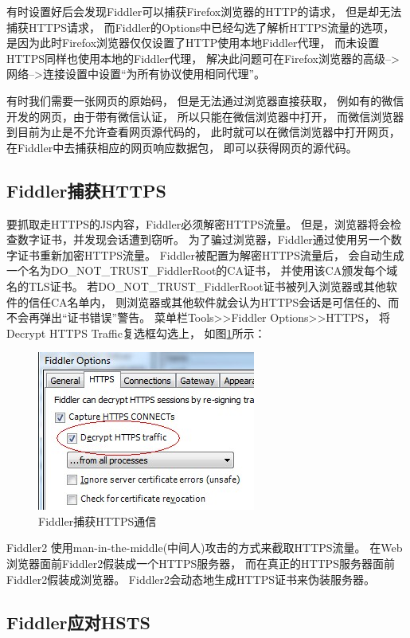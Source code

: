 \documentclass{book}
\begin{document}
有时设置好后会发现Fiddler可以捕获Firefox浏览器的HTTP的请求，
但是却无法捕获HTTPS请求，
而Fiddler的Options中已经勾选了解析HTTPS流量的选项，
是因为此时Firefox浏览器仅仅设置了HTTP使用本地Fiddler代理，
而未设置HTTPS同样也使用本地的Fiddler代理，
解决此问题可在Firefox浏览器的高级-->网络-->连接设置中设置“为所有协议使用相同代理”。

有时我们需要一张网页的原始码，
但是无法通过浏览器直接获取，
例如有的微信开发的网页，由于带有微信认证，
所以只能在微信浏览器中打开，
而微信浏览器到目前为止是不允许查看网页源代码的，
此时就可以在微信浏览器中打开网页，
在Fiddler中去捕获相应的网页响应数据包，
即可以获得网页的源代码。

\subsection{Fiddler捕获HTTPS}

要抓取走HTTPS的JS内容，Fiddler必须解密HTTPS流量。
但是，浏览器将会检查数字证书，并发现会话遭到窃听。
为了骗过浏览器，Fiddler通过使用另一个数字证书重新加密HTTPS流量。
Fiddler被配置为解密HTTPS流量后，
会自动生成一个名为DO\_NOT\_TRUST\_FiddlerRoot的CA证书，
并使用该CA颁发每个域名的TLS证书。
若DO\_NOT\_TRUST\_FiddlerRoot证书被列入浏览器或其他软件的信任CA名单内，
则浏览器或其他软件就会认为HTTPS会话是可信任的、而不会再弹出“证书错误”警告。
菜单栏Tools>>Fiddler Options>>HTTPS，
将Decrypt HTTPS Traffic复选框勾选上，
如图\ref{fig:FiddlerDecryptHttpsTraffic}所示：

\begin{figure}[htbp]
	\centering
	\includegraphics[scale=0.5]{FiddlerDecryptHttpsTraffic.jpg}
	\caption{Fiddler捕获HTTPS通信}
	\label{fig:FiddlerDecryptHttpsTraffic}
\end{figure}

Fiddler2 使用man-in-the-middle(中间人)攻击的方式来截取HTTPS流量。
在Web浏览器面前Fiddler2假装成一个HTTPS服务器，
而在真正的HTTPS服务器面前Fiddler2假装成浏览器。
Fiddler2会动态地生成HTTPS证书来伪装服务器。

\subsection{Fiddler应对HSTS}
\end{document}
